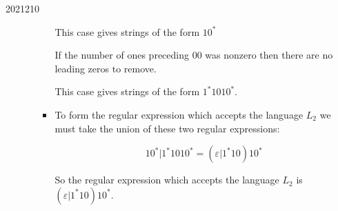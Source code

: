 \documentclass[10pt,\jkfside,a4paper]{article}
\begin{document}
\begin{examquestion}{2021}{2}{10}
\begin{enumerate}
\begin{enumerate}
\begin{itemize}
This case gives strings of the form $10^*$

If the number of ones preceding 00 was nonzero then there are no leading zeros to remove. 

This case gives strings of the form $1^*1010^*$.

\item To form the regular expression which accepts the language $L_2$ we must take the union 
of these two regular expressions:

\[
10^*|1^*1010^* = (\varepsilon|1^*10)10^*
\]

So the regular expression which accepts the language $L_2$ is $(\varepsilon|1^*10)10^*$.

\end{itemize}

\end{enumerate}

\end{enumerate}

\end{examquestion}
\end{document}
